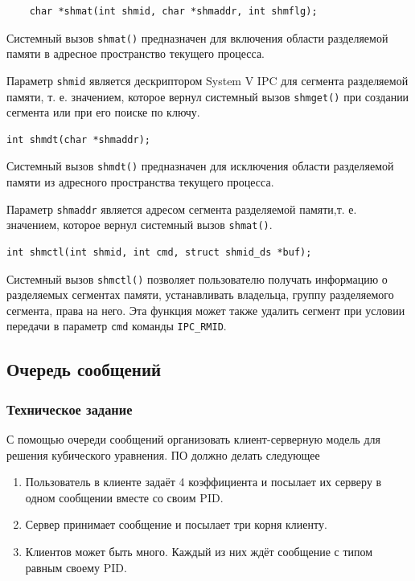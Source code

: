 \documentclass[a4paper,14pt]{extarticle}
\begin{document}
\begin{verbatim}
    char *shmat(int shmid, char *shmaddr, int shmflg);
\end{verbatim}

Системный вызов \verb|shmat()| предназначен для включения области разделяемой памяти в адресное пространство текущего процесса.

Параметр \verb|shmid| является дескриптором System V IPC для сегмента разделяемой памяти, т. е. значением, которое вернул системный вызов \verb|shmget()| при создании сегмента или при его поиске по ключу.

\begin{verbatim}
int shmdt(char *shmaddr);
\end{verbatim}

Системный вызов \verb|shmdt()| предназначен для исключения области разделяемой памяти из адресного пространства текущего процесса.

Параметр \verb|shmaddr| является адресом сегмента разделяемой памяти,т. е. значением, которое вернул системный вызов \verb|shmat()|.

\begin{verbatim}
int shmctl(int shmid, int cmd, struct shmid_ds *buf);
\end{verbatim}

Системный вызов \verb|shmctl()| позволяет пользователю получать информацию о разделяемых сегментах памяти, устанавливать владельца, группу разделяемого сегмента, права на него. Эта функция может также удалить сегмент при условии передачи в параметр \verb|cmd| команды \verb|IPC_RMID|.

\subsection{Очередь сообщений}
\subsubsection{Техническое задание}
С помощью очереди сообщений организовать клиент-серверную модель для решения кубического уравнения. ПО должно делать следующее 
\begin{enumerate}
	\item Пользователь в клиенте задаёт 4 коэффициента и посылает их серверу в одном сообщении вместе со своим PID.
	\item Сервер принимает сообщение и посылает три корня клиенту.
	\item Клиентов может быть много. Каждый из них ждёт сообщение с типом равным своему PID.
\end{enumerate}
\end{document}
